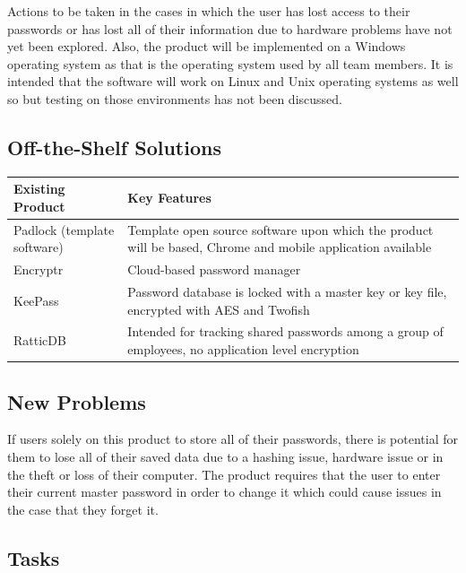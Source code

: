 \documentclass[12pt, titlepage]{article}
\begin{document}
Actions to be taken in the cases in which the user has lost access to their passwords or has lost all of their information due to hardware problems have not yet been explored. Also, the product will be implemented on a Windows operating system as that is the operating system used by all team members. It is intended that the software will work on Linux and Unix operating systems as well so but testing on those environments has not been discussed.

\subsection{Off-the-Shelf Solutions}
\begin{table}[H]
\centering
{}
\begin{tabular}{ | p{3cm} | p{10cm} | }
	\hline
	Existing Product & Key Features \\
	\hline
	Padlock (template software) \cite{PadLockGit:2} & Template open source software upon which the product will be based, Chrome and mobile application available \\
	\hline
	Encryptr \cite{EncryptrGit:4} & Cloud-based password manager \\
	\hline
	KeePass \cite{KeePassSite:3} & Password database is locked with a master key or key file, encrypted with AES and Twofish \\
	\hline
	RatticDB \cite{RatticDBSite:5} & Intended for tracking shared  passwords among a group of employees, no application level encryption \\
\hline
\end{tabular}
\end{table}


\subsection{New Problems}

If users solely on this product to store all of their passwords, there is potential for them to lose all of their saved data due to a hashing issue, hardware issue or in the theft or loss of their computer. The product requires that the user to enter their current master password in order to change it which could cause issues in the case that they forget it.

\subsection{Tasks}
\end{document}

